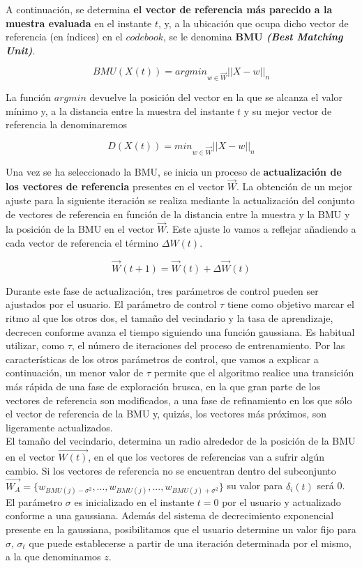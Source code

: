 A continuación, se determina \textbf{el vector de referencia más parecido a la muestra evaluada} en el instante $t$, y, a la ubicación que ocupa dicho vector de referencia (en índices) en el $codebook$, se le denomina \textbf{BMU \textit{(Best Matching Unit)}}.

$$ BMU(X(t)) = argmin_{w \in \vec{W}}{||X-w||}_n$$

La función $argmin$ devuelve la posición del vector en la que se alcanza el valor mínimo y, a la distancia entre la muestra del instante $t$ y su mejor vector de referencia la denominaremos

$$ D(X(t)) = min_{w \in \vec{W}}{||X-w||}_n$$

Una vez se ha seleccionado la BMU, se inicia un proceso de \textbf{actualización de los vectores de referencia} presentes en el vector $\vec{W}$. La obtención de un mejor ajuste para la siguiente iteración se realiza mediante la actualización del conjunto de vectores de referencia en función de la distancia entre la muestra y la BMU y la posición de la BMU en el vector $\vec{W}$. Este ajuste lo vamos a reflejar añadiendo a cada vector de referencia el término $\Delta W(t)$.

$$\vec{W}(t+1) = \vec{W}(t) + \Delta \vec{W}(t)$$

Durante este fase de actualización, tres parámetros de control pueden ser ajustados por el usuario. El parámetro de control $\tau$ tiene como objetivo marcar el ritmo al que los otros dos, el tamaño del vecindario y la tasa de aprendizaje, decrecen conforme avanza el tiempo siguiendo una función gaussiana. Es habitual utilizar, como $\tau$, el número de iteraciones del proceso de entrenamiento. Por las características de los otros parámetros de control, que vamos a explicar a continuación, un menor valor de $\tau$ permite que el algoritmo realice una transición más rápida de una fase de exploración brusca, en la que gran parte de los vectores de referencia son modificados, a una fase de refinamiento en los que sólo el vector de referencia de la BMU y, quizás, los vectores más próximos, son ligeramente actualizados.\\

El tamaño del vecindario, determina un radio alrededor de la posición de la BMU en el vector $\vec{W(t)}$, en el que los vectores de referencias van a sufrir algún cambio. Si los vectores de referencia no se encuentran dentro del subconjunto $\vec{W_A} = \{w_{BMU(j)-\sigma^2}, ..., w_{BMU(j)}, ..., w_{BMU(j)+ \sigma^2} \}$ su valor para $\delta_i(t)$ será 0. El parámetro $\sigma$ es inicializado en el instante $t=0$ por el usuario y actualizado conforme a una gaussiana. Además del sistema de decrecimiento exponencial presente en la gaussiana, posibilitamos que el usuario determine un valor fijo para $\sigma$, $\sigma_t$ que puede establecerse a partir de una iteración determinada por el mismo, a la que denominamos $z$.


